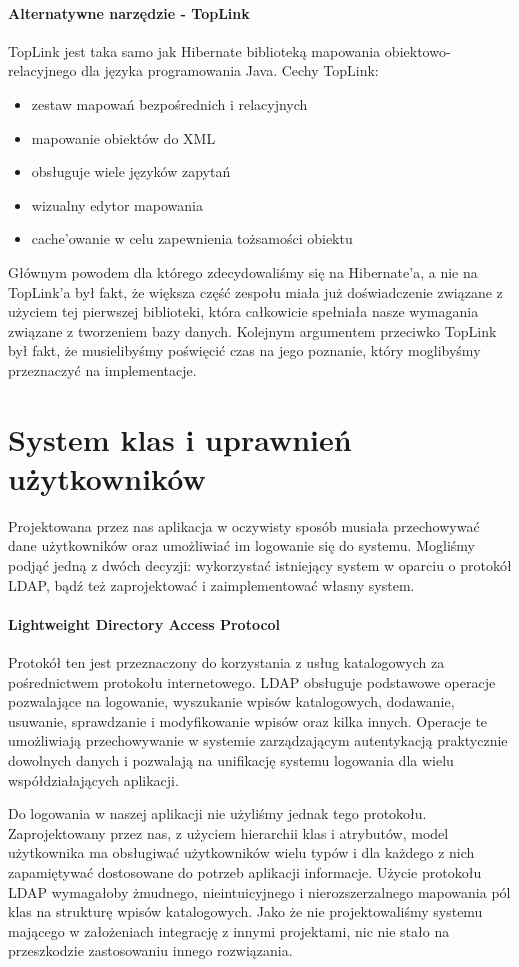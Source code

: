 \documentclass[licencjacka]{pracamgr}
\begin{document}
\paragraph{Alternatywne narzędzie - TopLink}
TopLink jest taka samo jak Hibernate biblioteką mapowania obiektowo-relacyjnego dla języka programowania Java. Cechy TopLink:
\begin{itemize}
\item zestaw mapowań bezpośrednich i relacyjnych
\item mapowanie obiektów do XML
\item obsługuje wiele języków zapytań
\item wizualny edytor mapowania
\item cache'owanie w celu zapewnienia tożsamości obiektu
\end{itemize}
Głównym powodem dla którego zdecydowaliśmy się na Hibernate'a, a nie na TopLink'a był fakt, że większa część zespołu miała już 
doświadczenie związane z użyciem tej pierwszej biblioteki, która całkowicie spełniała nasze wymagania związane z tworzeniem bazy 
danych. Kolejnym argumentem przeciwko TopLink był fakt, że musielibyśmy poświęcić czas na jego poznanie, który moglibyśmy 
przeznaczyć na implementacje.

\section{System klas i uprawnień użytkowników}
Projektowana przez nas aplikacja w oczywisty sposób musiała przechowywać dane użytkowników oraz umożliwiać im logowanie się do systemu. Mogliśmy podjąć jedną z dwóch decyzji: wykorzystać istniejący system w oparciu o protokół LDAP, bądź też zaprojektować i zaimplementować własny system.

\paragraph{Lightweight Directory Access Protocol}
Protokół ten jest przeznaczony do korzystania z usług katalogowych za pośrednictwem protokołu internetowego. LDAP obsługuje podstawowe operacje pozwalające na logowanie, wyszukanie wpisów katalogowych, dodawanie, usuwanie, sprawdzanie i modyfikowanie wpisów oraz kilka innych. Operacje te umożliwiają przechowywanie w systemie zarządzającym autentykacją praktycznie dowolnych danych i pozwalają na unifikację systemu logowania dla wielu współdziałających aplikacji.

Do logowania w naszej aplikacji nie użyliśmy jednak tego protokołu. Zaprojektowany przez nas, z użyciem hierarchii klas i atrybutów, model użytkownika ma obsługiwać użytkowników wielu typów i dla każdego z nich zapamiętywać dostosowane do potrzeb aplikacji informacje. Użycie protokołu LDAP wymagałoby żmudnego, nieintuicyjnego i nierozszerzalnego mapowania pól klas na strukturę wpisów katalogowych. Jako że nie projektowaliśmy systemu mającego w założeniach integrację z innymi projektami, nic nie stało na przeszkodzie zastosowaniu innego rozwiązania.
\end{document}
